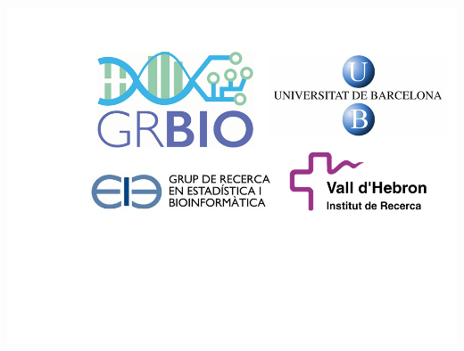 {\begin{minipage}{0.2\textwidth}
\begin{center}
   \includegraphics[width=14cm]{images/allLogos.png}
   \end{center}
\end{minipage}
}